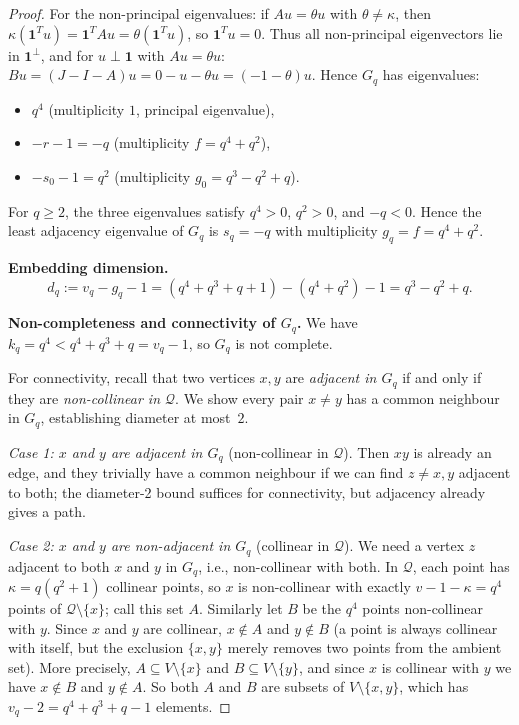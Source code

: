 \begin{proof}
For the non-principal eigenvalues: if $Au=\theta u$ with $\theta\ne\kappa$, then $\kappa(\mathbf{1}^Tu)=\mathbf{1}^T A u=\theta(\mathbf{1}^Tu)$, so $\mathbf{1}^Tu=0$. Thus all non-principal eigenvectors lie in $\mathbf{1}^\perp$, and for $u\perp\mathbf{1}$ with $Au=\theta u$: $Bu=(J-I-A)u=0-u-\theta u=(-1-\theta)u$. Hence $G_q$ has eigenvalues:
\begin{itemize}
  \item $q^4$ (multiplicity $1$, principal eigenvalue),
  \item $-r-1=-q$ (multiplicity $f=q^4+q^2$),
  \item $-s_0-1=q^2$ (multiplicity $g_0=q^3-q^2+q$).
\end{itemize}

For $q\ge 2$, the three eigenvalues satisfy $q^4>0$, $q^2>0$, and $-q<0$. Hence the least adjacency eigenvalue of $G_q$ is $s_q=-q$ with multiplicity $g_q=f=q^4+q^2$.

\textbf{Embedding dimension.}
\[
d_q:=v_q-g_q-1=(q^4+q^3+q+1)-(q^4+q^2)-1=q^3-q^2+q.
\]

\textbf{Non-completeness and connectivity of $G_q$.} We have $k_q=q^4<q^4+q^3+q=v_q-1$, so $G_q$ is not complete.

For connectivity, recall that two vertices $x,y$ are \emph{adjacent in $G_q$} if and only if they are \emph{non-collinear in $\mathcal{Q}$}. We show every pair $x\ne y$ has a common neighbour in $G_q$, establishing diameter at most~$2$.

\emph{Case 1: $x$ and $y$ are adjacent in $G_q$} (non-collinear in $\mathcal{Q}$). Then $xy$ is already an edge, and they trivially have a common neighbour if we can find $z\ne x,y$ adjacent to both; the diameter-2 bound suffices for connectivity, but adjacency already gives a path.

\emph{Case 2: $x$ and $y$ are non-adjacent in $G_q$} (collinear in $\mathcal{Q}$). We need a vertex $z$ adjacent to both $x$ and $y$ in $G_q$, i.e., non-collinear with both. In $\mathcal{Q}$, each point has $\kappa=q(q^2+1)$ collinear points, so $x$ is non-collinear with exactly $v-1-\kappa=q^4$ points of $\mathcal{Q}\setminus\{x\}$; call this set $A$. Similarly let $B$ be the $q^4$ points non-collinear with $y$. Since $x$ and $y$ are collinear, $x\notin A$ and $y\notin B$ (a point is always collinear with itself, but the exclusion $\{x,y\}$ merely removes two points from the ambient set). More precisely, $A\subseteq V\setminus\{x\}$ and $B\subseteq V\setminus\{y\}$, and since $x$ is collinear with $y$ we have $x\notin B$ and $y\notin A$. So both $A$ and $B$ are subsets of $V\setminus\{x,y\}$, which has $v_q-2=q^4+q^3+q-1$ elements.


\end{proof}
